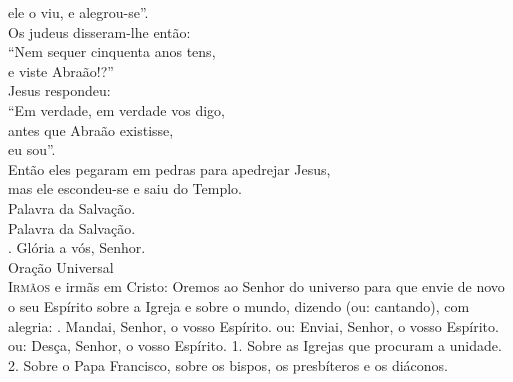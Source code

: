 \documentclass{book}
\begin{document}
\begin{flushleft}
    ele o viu, e alegrou-se''. \\
    Os judeus disseram-lhe então: \\
    ``Nem sequer cinquenta anos tens, \\
    e viste Abraão!?'' \\
    Jesus respondeu: \\
    ``Em verdade, em verdade vos digo, \\
    antes que Abraão existisse, \\
    eu sou''. \\
    Então eles pegaram em pedras para apedrejar Jesus, \\
    mas ele escondeu-se e saiu do Templo. \\
    Palavra da Salvação.
    \vspace{.2cm} \\
    Palavra da Salvação. \\
    {\color{VioletRed2} \Rbar.} Glória a vós, Senhor.
    \vspace{.2cm} \\
    \textcolor{VioletRed2}{Oração Universal}
    \vspace{.2cm} \\
    \lettrine[findent=2pt]{\color{VioletRed2}I}{rmãos} e irmãs em Cristo:
    \newline
    Oremos ao Senhor do universo
    \newline
    para que envie de novo o seu Espírito
    \newline
    sobre a Igreja e sobre o mundo,
    \newline
    dizendo \textcolor{VioletRed2}{(ou:} cantando\textcolor{VioletRed2}{)}, com alegria:
    \vspace{.2cm}
    \newline
    {\color{VioletRed2} \Rbar.} Mandai, Senhor, o vosso Espírito.
    \newline
    \textcolor{VioletRed2}{ou:} Enviai, Senhor, o vosso Espírito.
    \newline
    \textcolor{VioletRed2}{ou:} Desça, Senhor, o vosso Espírito.
    \vspace{.2cm}
    \newline
    {\color{VioletRed2} 1.} Sobre as Igrejas que procuram a unidade.
    \vspace{.2cm}
    \newline
    {\color{VioletRed2} 2.} Sobre o Papa Francisco, sobre os bispos, os presbíteros e os diáconos.
    \vspace{.2cm}

\end{flushleft}
\end{document}
